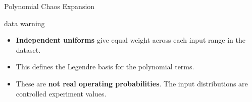 \begin{frame}{Polynomial Chaos Expansion}
\begin{uncoverenv}
\begin{beamercolorbox}[sep=1.7mm,wd=\textwidth]{data warning}
\begin{itemize}
      \setlength{\itemsep}{1pt}
      \item \textbf{Independent uniforms} give equal weight across each input range in the dataset.
      \item This defines the Legendre basis for the polynomial terms.
      \item These are \textbf{not real operating probabilities}. The input distributions are controlled experiment values.
    \end{itemize}
  \end{beamercolorbox}
  \end{uncoverenv}
\end{frame}

